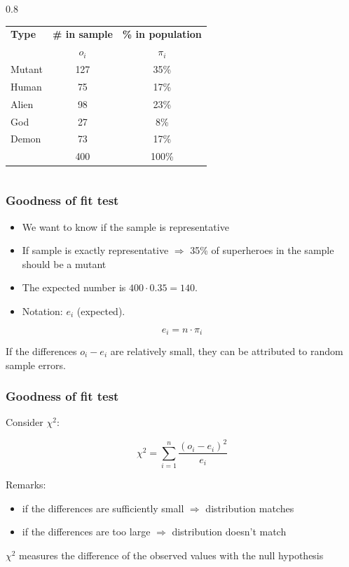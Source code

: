 \documentclass{beamer}
\begin{document}
\begin{frame}
\begin{columns}
    \begin{column} { 0.8 \textwidth}
    \begin{table}
\begin{tabular}{lcc}
	\toprule
	\textbf{Type} & \textbf{\# in sample} & \textbf{\% in population} \\
	              & $o_i$              & $\pi_i$                     \\ \midrule
	Mutant        & 127                   & 35\%                      \\
	Human         & 75                    & 17\%                      \\
	Alien         & 98                    & 23\%                      \\
	God           & 27                    & 8\%                       \\
	Demon         & 73                    & 17\%                      \\ \bottomrule
	              & 400                   & 100\%                      \\

\end{tabular}

\end{table}
    \end{column}
  \end{columns}
\end{frame}

\begin{frame}
  \frametitle{Goodness of fit test}
  
  \begin{itemize}
    \item We want to know if the sample is representative
    \item If sample is exactly representative $\Rightarrow$ 35\% of superheroes in the sample should be a mutant
    \item The expected number is $400 \cdot 0.35 = 140$.
    \item Notation: $e_i$ (expected).
  \end{itemize}

  \[ e_i = n \cdot \pi_i \]
  
  If the differences $o_i - e_i$ are relatively small, they can be attributed to random sample errors.
\end{frame}

\begin{frame}
  \frametitle{Goodness of fit test}
  Consider $\chi^{2}$:

  \[ \chi^{2} = \sum_{i=1}^{n} \frac{(o_{i} - e_{i})^{2}}{e_{i}} \]

  Remarks:
  \begin{itemize}
    \item if the differences are sufficiently small $\Rightarrow$ distribution matches
    \item if the differences are too large $\Rightarrow$ distribution doesn't match
  \end{itemize}
  
  $\chi^{2}$ measures the difference of the observed values with the null hypothesis
\end{frame}
\end{document}

